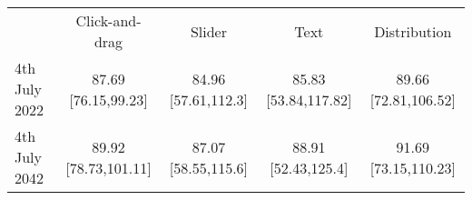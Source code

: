 
\begin{tabular}[t]{lcccc}
\toprule
\multicolumn{1}{c}{ } & \multicolumn{1}{c}{Click-and-drag} & \multicolumn{1}{c}{Slider} & \multicolumn{1}{c}{Text} & \multicolumn{1}{c}{Distribution} \\
\cmidrule(l{3pt}r{3pt}){2-2} \cmidrule(l{3pt}r{3pt}){3-3} \cmidrule(l{3pt}r{3pt}){4-4} \cmidrule(l{3pt}r{3pt}){5-5}
4th July 2022 & 87.69 [76.15,99.23] & 84.96 [57.61,112.3] & 85.83 [53.84,117.82] & 89.66 [72.81,106.52]\\
4th July 2042 & 89.92 [78.73,101.11] & 87.07 [58.55,115.6] & 88.91 [52.43,125.4] & 91.69 [73.15,110.23]\\
\bottomrule
\end{tabular}
